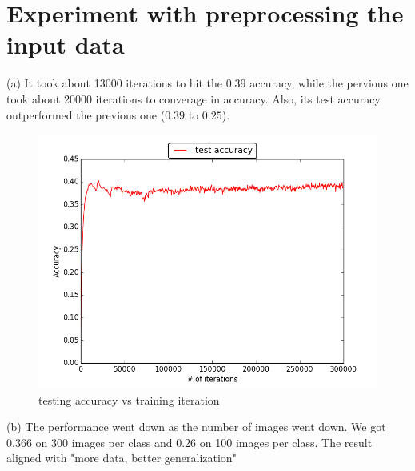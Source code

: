 \documentclass{article} %
\begin{document}
\section{Experiment with preprocessing the input data}
(a) It took about 13000 iterations to hit the $0.39$ accuracy, while the pervious one took about 20000 iterations to converage in accuracy. Also, its test accuracy outperformed the previous one ($0.39$ to $0.25$).

\begin{figure}[H]
    \begin{minipage}{0.5\linewidth}
        \centering
        \includegraphics[scale=0.5]{netmean.png}
        \caption{testing accuracy vs training iteration}
    \end{minipage}
\end{figure}
(b) The performance went down as the number of images went down. We got $0.366$ on 300 images per class and $0.26$ on 100 images per class. The result aligned with "more data, better generalization"
\end{document}
